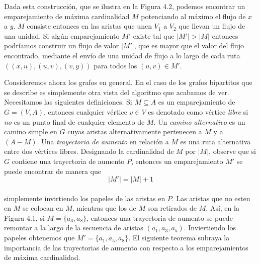 \documentclass[10pt,a5paper]{book}
\begin{document}
Dada esta construcción, que se ilustra en la Figura 4.2, podemos encontrar un emparejamiento de máxima cardinalidad $M$ potenciando al máximo el flujo de $x$ a $y$. $M$ consiste entonces en las aristas que unen $V_1$ a $V_2$ que llevan un flujo de una unidad. Si algún emparejamiento $M'$ existe tal que $|M'| > |M|$ entonces podríamos construir un flujo de valor $|M'|$, que es mayor que el valor del flujo encontrado, mediante el envío de una unidad de flujo a lo largo de cada ruta $((x,u), (u,v), (v,y))$ para todos los $(u,v) \in M'$.

Consideremos ahora los grafos en general. En el caso de los grafos bipartitos que se describe es simplemente otra vista del algoritmo que acabamos de ver. Necesitamos las siguientes definiciones. Si $M \subseteq A$ es un emparejamiento de $G = (V,A)$, entonces cualquier vértice $v \in V$ es denotado como vértice \emph{libre} si \emph{no} es un punto final de cualquier elemento de $M$. Un \emph{camino alternativo} es un camino simple en $G$ cuyas aristas alternativamente pertenecen a $M$ y a $(A - M)$. Una \emph{trayectoria de aumento} en relación a $M$ es una ruta alternativa entre dos vértices libres. Designando la cardinalidad de $M$ por $|M|$, observe que si $G$ contiene una trayectoria de aumento $P$, entonces un emparejamiento $M'$ se puede encontrar de manera que\\
$$|M'| = |M| + 1$$\\
simplemente invirtiendo los papeles de las aristas en $P$. Las aristas que no esten en $M$ se colocan en $M$, mientras que los de $M$ son retirados de $M$. Así, en la Figura 4.1, si $M = \{a_3,a_8\}$, entonces una trayectoria de aumento se puede remontar a la largo de la secuencia de aristas $(a_1, a_3, a_5)$. Inviertiendo los papeles obtenemos que $M' = \{a_1,a_5,a_8\}$. El siguiente teorema subraya la importancia de las trayectorias de aumento con respecto a los emparejamientos de máxima cardinalidad.
\end{document}
